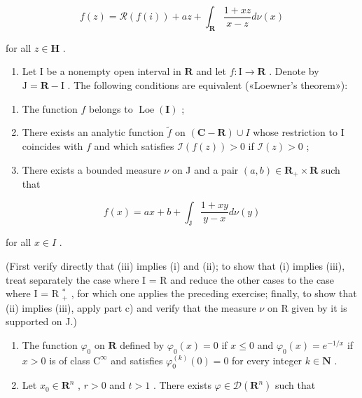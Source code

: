 \[
f (z) = \mathcal {R} (f (i)) + a z + \int_ {\mathbf {R}} \frac {1 + x z}{x - z} d \nu (x)
\]

for all \(z \in \mathbf{H}\) .

\begin{enumerate}
\def\labelenumi{\alph{enumi})}
\setcounter{enumi}{3}
\tightlist
\item
  Let I be a nonempty open interval in \(\mathbf{R}\) and let \(f\colon \mathrm{I}\to \mathbf{R}\) . Denote by \(\mathrm{J} = \mathbf{R} - \mathrm{I}\) . The following conditions are equivalent («Loewner's theorem»):
\end{enumerate}

\begin{enumerate}
\def\labelenumi{(\roman{enumi})}
\item
  The function \(f\) belongs to \(\operatorname{Loe}(\mathbf{I})\) ;
\item
  There exists an analytic function \(\widetilde{f}\) on \((\mathbf{C} - \mathbf{R}) \cup I\) whose restriction to I coincides with \(f\) and which satisfies \(\mathcal{I}(f(z)) > 0\) if \(\mathcal{I}(z) > 0\) ;
\item
  There exists a bounded measure \(\nu\) on J and a pair \((a,b)\in\mathbf{R}_{+}\times\mathbf{R}\) such that
\end{enumerate}

\[
f (x) = a x + b + \int_ {\mathrm{J}} \frac {1 + x y}{y - x} d \nu (y)
\]

for all \(x \in I\) .

(First verify directly that (iii) implies (i) and (ii); to show that (i) implies (iii), treat separately the case where I = R and reduce the other cases to the case where I = R \(_{+}^{*}\) , for which one applies the preceding exercise; finally, to show that (ii) implies (iii), apply part c) and verify that the measure \(\nu\) on R given by it is supported on J.)

\exercisesection{}

\begin{enumerate}
\def\labelenumi{\arabic{enumi})}
\item
  The function \(\varphi_0\) on \(\mathbf{R}\) defined by \(\varphi_0(x) = 0\) if \(x \leqslant 0\) and \(\varphi_0(x) = e^{-1/x}\) if \(x > 0\) is of class \(\mathrm{C}^\infty\) and satisfies \(\varphi_0^{(k)}(0) = 0\) for every integer \(k \in \mathbf{N}\) .
\item
  Let \(x_0 \in \mathbf{R}^n\) , \(r > 0\) and \(t > 1\) . There exists \(\varphi \in \mathcal{D}(\mathbf{R}^n)\) such that
\end{enumerate}

